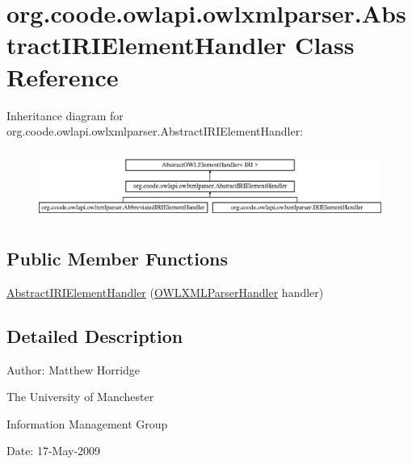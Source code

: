 \hypertarget{classorg_1_1coode_1_1owlapi_1_1owlxmlparser_1_1_abstract_i_r_i_element_handler}{\section{org.\-coode.\-owlapi.\-owlxmlparser.\-Abstract\-I\-R\-I\-Element\-Handler Class Reference}
\label{classorg_1_1coode_1_1owlapi_1_1owlxmlparser_1_1_abstract_i_r_i_element_handler}
}
Inheritance diagram for org.\-coode.\-owlapi.\-owlxmlparser.\-Abstract\-I\-R\-I\-Element\-Handler\-:\begin{figure}[H]
\begin{center}
\leavevmode
\includegraphics[height=2.258065cm]{classorg_1_1coode_1_1owlapi_1_1owlxmlparser_1_1_abstract_i_r_i_element_handler}
\end{center}
\end{figure}
\subsection*{Public Member Functions}
\begin{DoxyCompactItemize}
\item 
\hyperlink{classorg_1_1coode_1_1owlapi_1_1owlxmlparser_1_1_abstract_i_r_i_element_handler_a43f4b2e3b9b656f57e7a4e869e00a463}{Abstract\-I\-R\-I\-Element\-Handler} (\hyperlink{classorg_1_1coode_1_1owlapi_1_1owlxmlparser_1_1_o_w_l_x_m_l_parser_handler}{O\-W\-L\-X\-M\-L\-Parser\-Handler} handler)
\end{DoxyCompactItemize}


\subsection{Detailed Description}
Author\-: Matthew Horridge\par
 The University of Manchester\par
 Information Management Group\par
 Date\-: 17-\/\-May-\/2009 

